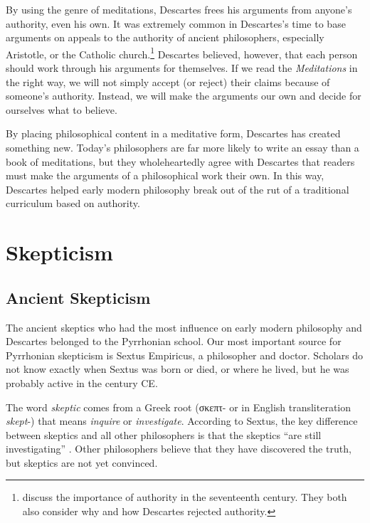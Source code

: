 By using the genre of meditations, Descartes frees his arguments from anyone's authority, even his own. It was extremely common in Descartes's time to base arguments on appeals to the authority of ancient philosophers, especially Aristotle, or the Catholic church.\footnote{\textcites[4--7]{cottingham1986}[4--5]{garber1998} discuss the importance of authority in the seventeenth century. They both also consider why and how Descartes rejected authority.} Descartes believed, however, that each person should work through his arguments for themselves. If we read the \textit{Meditations} in the right way, we will not simply accept (or reject) their claims because of someone's authority. Instead, we will make the arguments our own and decide for ourselves what to believe.

By placing philosophical content in a meditative form, Descartes has created something new. Today's philosophers are far more likely to write an essay than a book of meditations, but they wholeheartedly agree with Descartes that readers must make the arguments of a philosophical work their own. In this way, Descartes helped early modern philosophy break out of the rut of a traditional curriculum based on authority.

\section*{Skepticism}

\subsection*{Ancient Skepticism}

The ancient skeptics who had the most influence on early modern philosophy and Descartes belonged to the Pyrrhonian school. Our most important source for Pyrrhonian skepticism is Sextus Empiricus, a philosopher and doctor. Scholars do not know exactly when Sextus was born or died, or where he lived, but he was probably active in the  century CE.

The word \textit{skeptic} comes from a Greek root (\textgreek{σκεπτ}- or in English transliteration \textit{skept}-) that means \textit{inquire} or \textit{investigate}. According to Sextus, the key difference between skeptics and all other philosophers is that the skeptics ``are still investigating'' \parencite[I 3]{annasbarnes1994}. Other philosophers believe that they have discovered the truth, but skeptics are not yet convinced.


